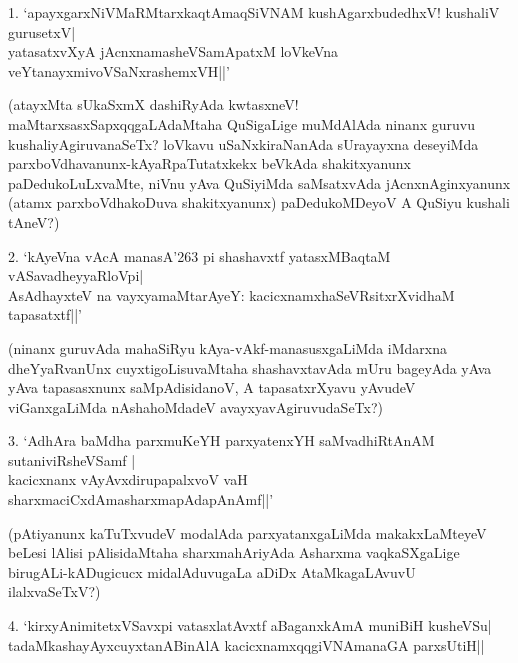 \begin{itemize}


\begin{shloka}
\item[1.]\qquad `apayxgarxNiVMaRMtarxkaqtAmaqSiVNAM kushAgarxbudedhxV! kushaliV gurusetxV|\\\label{55}
\qquad yatasatxvXyA jAcnxnamasheVSamApatxM loVkeVna veYtanayxmivoVSaNxrashemxVH||'
\end{shloka}

(atayxMta sUkaSxmX dashiRyAda kwtasxneV! maMtarxsasxSapxqqgaLAdaMtaha QuSigaLige muMdAlAda ninanx guruvu kushaliyAgiruvanaSeTx? loVkavu uSaNxkiraNanAda sUrayayxna deseyiMda parxboVdhavanunx-kAyaRpaTutatxkekx beVkAda shakitxyanunx paDedukoLuLxvaMte, niVnu yAva QuSiyiMda saMsatxvAda jAcnxnAginxyanunx (atamx parxboVdhakoDuva shakitxyanunx) paDedukoMDeyoV A QuSiyu kushali tAneV?)


\begin{shloka}
\item[2.] \qquad `kAyeVna vAcA manasA\char'263 pi shashavxtf yatasxMBaqtaM vASavadheyyaRloVpi|\\\label{56}
\qquad AsAdhayxteV na vayxyamaMtarAyeY: kacicxnamxhaSeVRsitxrXvidhaM tapasatxtf||'
\end{shloka}

(ninanx guruvAda mahaSiRyu kAya-vAkf-manasusxgaLiMda iMdarxna dheYyaRvanUnx cuyxtigoLisuvaMtaha shashavxtavAda mUru bageyAda yAva yAva tapasasxnunx saMpAdisidanoV, A tapasatxrXyavu yAvudeV viGanxgaLiMda nAshahoMdadeV avayxyavAgiruvudaSeTx?)

\begin{shloka}
\item[3.] `AdhAra baMdha parxmuKeYH parxyatenxYH saMvadhiRtAnAM sutaniviRsheVSamf |\\\label{page56}
kacicxnanx vAyAvxdirupapalxvoV vaH sharxmaciCxdAmasharxmapAdapAnAmf||'
\end{shloka}

(pAtiyanunx kaTuTxvudeV modalAda parxyatanxgaLiMda makakxLaMteyeV beLesi lAlisi pAlisidaMtaha sharxmahAriyAda Asharxma vaqkaSXgaLige birugALi-kADugicucx midalAduvugaLa aDiDx AtaMkagaLAvuvU ilalxvaSeTxV?)

\begin{shloka}
\item[4.] `kirxyAnimitetxVSavxpi vatasxlatAvxtf aBaganxkAmA muniBiH kusheVSu|\\\label{56}
tadaMkashayAyxcuyxtanABinAlA kacicxnamxqqgiVNAmanaGA parxsUtiH||
\end{shloka}


\end{itemize}
